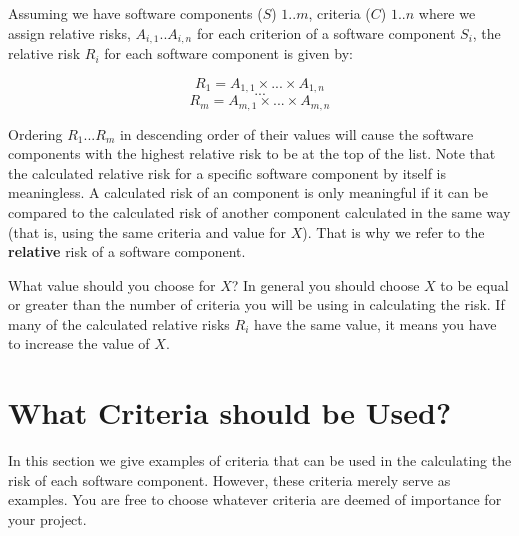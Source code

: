 \documentclass{amsart}
\begin{document}
Assuming we have software components ($S$) $1..m$, criteria ($C$) $1..n$ where we assign relative risks, $A_{i,1} .. A_{i,n}$ for each criterion of a software component $S_i$, the relative risk $R_i$ for each software component is given by:

\[R_1 =  A_{1,1} \times ... \times A_{1,n} \]
\[...\]
\[R_m =  A_{m,1} \times ... \times A_{m,n} \]

Ordering $R_1 ... R_m$ in descending order of their values will cause the software components with the highest relative risk to be at the top of the list. Note that the calculated relative risk for a specific software component by itself is meaningless. A calculated risk of an component is only meaningful if it can be compared to the calculated risk of another component calculated in the same way (that is, using the same criteria and value for $X$). That is why we refer to the \textbf{relative} risk of a software component.

What value should you choose for $X$? In general you should choose $X$ to be equal or greater than the number of criteria you will be using in calculating the risk. If many of the calculated relative risks $R_i$ have the same value, it means you have to increase the value of $X$.  

\section{What Criteria should be Used?} 
In this section we give examples of criteria that can be used in the calculating the risk of each software component. However, these criteria merely serve as examples. You are free to choose whatever criteria are deemed of importance for your project.
\end{document}
